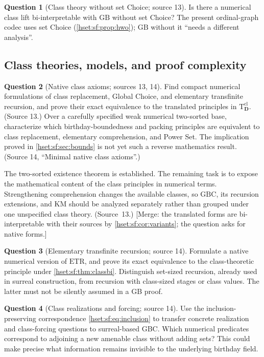 \documentclass[11pt,letterpaper]{article}
\theoremstyle{definition}
\newtheorem{question}[question]{Question}\aliascntresetthe{question}
\theoremstyle{remark}
\newcommand{\GB}{\mathrm{GB}}
\newcommand{\GBC}{\mathrm{GBC}}
\newcommand{\KM}{\mathrm{KM}}
\newcommand{\ETR}{\mathrm{ETR}}
\newcommand{\Dd}{\mathbf{D}}
\newcommand{\Tth}{\mathrm{T}}
\begin{document}
\begin{question}[Class theory without set Choice; source 13]\label{hset:sf:q:gbnochoice}
Is there a numerical class lift bi-interpretable with $\GB$ without set Choice? The
present ordinal-graph codec uses set Choice (\cref{hset:sf:prop:hwo}); $\GB$ without
it ``needs a different analysis''.
\end{question}

\subsection{Class theories, models, and proof complexity}

\begin{question}[Native class axioms; sources 13, 14]\label{hset:sf:q:classaxioms}
Find compact numerical formulations of class replacement, Global Choice, and
elementary transfinite recursion, and prove their exact equivalence to the translated
principles in $\Tth^{\mathrm{cl}}_{\Dd}$. (Source 13.) Over a carefully specified
weak numerical two-sorted base, characterize which birthday-boundedness and packing
principles are equivalent to class replacement, elementary comprehension, and Power
Set. The implication proved in \cref{hset:sf:sec:bounds} is not yet such a reverse
mathematics result. (Source 14, ``Minimal native class axioms''.)
\end{question}

The two-sorted existence theorem is established. The remaining task is to expose the
mathematical content of the class principles in numerical terms. Strengthening
comprehension changes the available classes, so $\GBC$, its recursion extensions, and
$\KM$ should be analyzed separately rather than grouped under one unspecified class
theory. (Source~13.) [Merge: the translated forms are bi-interpretable with their
sources by \cref{hset:sf:cor:variants}; the question asks for native forms.]

\begin{question}[Elementary transfinite recursion; source 14]\label{hset:sf:q:etr}
Formulate a native numerical version of $\ETR$, and prove its exact equivalence to the
class-theoretic principle under \cref{hset:sf:thm:classbi}. Distinguish set-sized
recursion, already used in surreal construction, from recursion with class-sized
stages or class values. The latter must not be silently assumed in a GB proof.
\end{question}

\begin{question}[Class realizations and forcing; source 14]\label{hset:sf:q:forcing}
Use the inclusion-preserving correspondence \eqref{hset:sf:eq:inclusion} to transfer
concrete realization and class-forcing questions to surreal-based GBC. Which
numerical predicates correspond to adjoining a new amenable class without adding
sets? This could make precise what information remains invisible to the underlying
birthday field.
\end{question}
\end{document}
